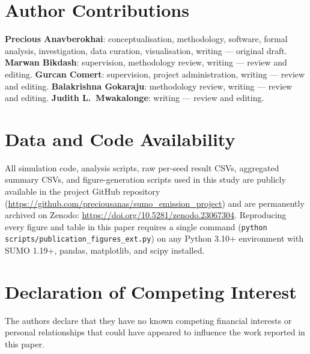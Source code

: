 \documentclass[review,3p,authoryear,times]{elsarticle}
\begin{document}


\section*{Author Contributions}
\textbf{Precious Anavberokhai}: conceptualisation, methodology, software, formal analysis,
investigation, data curation, visualisation, writing --- original draft.
\textbf{Marwan Bikdash}: supervision, methodology review, writing --- review and editing.
\textbf{Gurcan Comert}: supervision, project administration, writing --- review and editing.
\textbf{Balakrishna Gokaraju}: methodology review, writing --- review and editing.
\textbf{Judith L.\ Mwakalonge}: writing --- review and editing.

\section*{Data and Code Availability}
All simulation code, analysis scripts, raw per-seed result CSVs, aggregated summary CSVs,
and figure-generation scripts used in this study are publicly available in the project
GitHub repository (\url{https://github.com/preciousanas/sumo_emission_project}) and
are permanently archived on Zenodo: \url{https://doi.org/10.5281/zenodo.23067304}.
Reproducing every figure and table in this paper requires a single command
(\texttt{python scripts/publication\_figures\_ext.py}) on any Python 3.10+ environment
with SUMO 1.19+, pandas, matplotlib, and scipy installed.

\section*{Declaration of Competing Interest}
The authors declare that they have no known competing financial interests or personal
relationships that could have appeared to influence the work reported in this paper.
\end{document}
